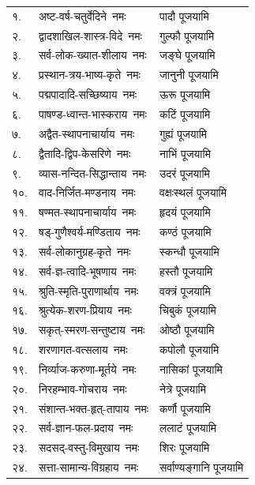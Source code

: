\begin{longtable}{ll@{— }l}
१. & अष्ट-वर्ष-चतुर्वेदिने~नमः & पादौ पूजयामि\\
२. & द्वादशाखिल-शास्त्र-विदे~नमः & गुल्फौ पूजयामि\\
३. & सर्व-लोक-ख्यात-शीलाय~नमः & जङ्घे पूजयामि\\
४. & प्रस्थान-त्रय-भाष्य-कृते~नमः & जानुनी पूजयामि\\
५. & पद्मपादादि-सच्छिष्याय~नमः & ऊरू पूजयामि\\
६. & पाषण्ड-ध्वान्त-भास्कराय~नमः & कटिं पूजयामि\\
७. & अद्वैत-स्थापनाचार्याय~नमः & गुह्यं पूजयामि\\
८. & द्वैतादि-द्विप-केसरिणे~नमः & नाभिं पूजयामि\\
९. & व्यास-नन्दित-सिद्धान्ताय~नमः & उदरं पूजयामि\\
१०. & वाद-निर्जित-मण्डनाय~नमः & वक्षःस्थलं पूजयामि\\
११. & षण्मत-स्थापनाचार्याय~नमः & हृदयं पूजयामि\\
१२. & षड्-गुणैश्वर्य-मण्डिताय~नमः & कण्ठं पूजयामि\\
१३. & सर्व-लोकानुग्रह-कृते~नमः & स्कन्धौ पूजयामि\\
१४. & सर्व-ज्ञ-त्वादि-भूषणाय~नमः & हस्तौ पूजयामि\\
१५. & श्रुति-स्मृति-पुराणार्थाय~नमः & वक्त्रं पूजयामि\\
१६. & श्रुत्येक-शरण-प्रियाय~नमः & चिबुकं पूजयामि\\
१७. & सकृत्-स्मरण-सन्तुष्टाय~नमः & ओष्ठौ पूजयामि\\
१८. & शरणागत-वत्सलाय~नमः & कपोलौ पूजयामि\\
१९. & निर्व्याज-करुणा-मूर्तये~नमः & नासिकां पूजयामि\\
२०. & निरहम्भाव-गोचराय~नमः & नेत्रे पूजयामि\\
२१. & संशान्त-भक्त-हृत्-तापाय~नमः & कर्णौ पूजयामि\\
२२. & सर्व-ज्ञान-फल-प्रदाय~नमः & ललाटं पूजयामि\\
२३. & सदसद्-वस्तु-विमुखाय~नमः & शिरः पूजयामि\\
२४. & सत्ता-सामान्य-विग्रहाय~नमः& सर्वाण्यङ्गानि पूजयामि\\
\end{longtable}

\begin{center}
    \begingroup
        \setlength{\columnseprule}{1pt}
        \let\chapt\sect
            
    \endgroup
\end{center}

